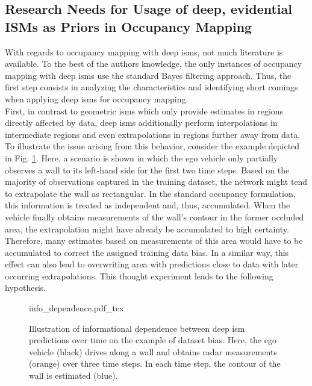 \subsection{Research Needs for Usage of deep, evidential ISMs as Priors in Occupancy Mapping}
\label{subsec:research_needs_for_usage_of_deep_ims_as_priors_in_occmapping}
With regards to occupancy mapping with deep \gls{ism}s, not much literature is available. To the best of the authors knowledge, the only instances of occupancy mapping with deep \gls{ism}s use the standard Bayes filtering approach. Thus, the first step consists in analyzing the characteristics and identifying short comings when applying deep \gls{ism}s for occupancy mapping.\\
First, in contrast to geometric \gls{ism}s which only provide estimates in regions directly affected by data, deep \gls{ism}s additionally perform interpolations in intermediate regions and even extrapolations in regions further away from data. To illustrate the issue arising from this behavior, consider the example depicted in Fig. \ref{fig:info_dependence}. Here, a scenario is shown in which the ego vehicle only partially observes a wall to its left-hand side for the first two time steps. Based on the majority of observations captured in the training dataset, the network might tend to extrapolate the wall as rectangular. In the standard occupancy formulation, this information is treated as independent and, thus, accumulated. When the vehicle finally obtains measurements of the wall's contour in the former occluded area, the extrapolation might have already be accumulated to high certainty. Therefore, many estimates based on measurements of this area would have to be accumulated to correct the assigned training data bias. In a similar way, this effect can also lead to overwriting area with predictions close to data with later occurring extrapolations. This thought experiment leads to the following hypothesis.
\begin{figure}
	\begin{center}
		{info_dependence.pdf_tex}
		\caption{\label{fig:info_dependence}Illustration of informational dependence between deep \gls{ism} predictions over time on the example of dataset bias. Here, the ego vehicle (black) drives along a wall and obtains radar measurements (orange) over three time steps. In each time step, the contour of the wall is estimated (blue).}
	\end{center}
\end{figure}  
\\
